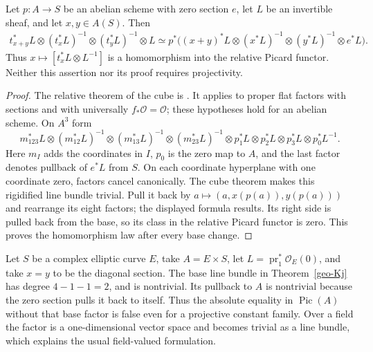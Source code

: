 \begin{theorem}
\label{geo-Kj}
Let $p:A\to S$ be an abelian scheme with zero section $e$, let $L$ be an
invertible sheaf, and let $x,y\in A(S)$. Then
\begin{align*}
 t_{x+y}^*L\otimes(t_x^*L)^{-1}\otimes(t_y^*L)^{-1}\otimes L
 \simeq p^*\bigl((x+y)^*L\otimes(x^*L)^{-1}
 \otimes(y^*L)^{-1}\otimes e^*L\bigr).
\end{align*}
Thus $x\mapsto[t_x^*L\otimes L^{-1}]$ is a homomorphism into the relative
Picard functor. Neither this assertion nor its proof requires projectivity.
\end{theorem}
\begin{proof}
The relative theorem of the cube is
\cite[VII, Theorem 3.1, pp.~VII-6--VII-8]{RaynaudOrsay1967}. It applies to
proper flat factors with sections and with universally
$f_*\mathcal O=\mathcal O$; these hypotheses hold for an abelian scheme.
On $A^3$ form
\[
 m_{123}^*L\otimes(m_{12}^*L)^{-1}\otimes(m_{13}^*L)^{-1}
 \otimes(m_{23}^*L)^{-1}\otimes p_1^*L\otimes p_2^*L
 \otimes p_3^*L\otimes p_0^*L^{-1}.
\]
Here $m_I$ adds the coordinates in $I$, $p_0$ is the zero map to $A$, and the last factor denotes
pullback of $e^*L$ from $S$. On each coordinate hyperplane with one
coordinate zero, factors cancel canonically. The cube theorem makes this
rigidified line bundle trivial. Pull it back by
$a\mapsto(a,x(p(a)),y(p(a)))$ and rearrange its eight factors; the
displayed formula results. Its right side is pulled back from the base,
so its class in the relative Picard functor is zero. This proves the
homomorphism law after every base change.
\end{proof}

\begin{example}
\label{geo-Kj-base}
Let $S$ be a complex elliptic curve $E$, take $A=E\times S$, let
$L=\operatorname{pr}_1^*\mathcal O_E(0)$, and take $x=y$ to be the
diagonal section. The base line bundle in Theorem~\ref{geo-Kj} has degree
$4-1-1=2$, and is nontrivial. Its pullback to $A$ is nontrivial because
the zero section pulls it back to itself. Thus the absolute equality in
$\operatorname{Pic}(A)$ without that base factor is false even for a
projective constant family. Over a field the factor is a one-dimensional
vector space and becomes trivial as a line bundle, which explains the
usual field-valued formulation.
\end{example}
